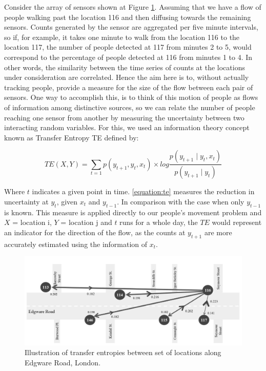 Consider the array of sensors shown at Figure \ref{figure:applications:transent}. Assuming that we have a flow of people walking past the location 116 and then diffusing towards the remaining sensors.
Counts generated by the sensor are aggregated per five minute intervals, so if, for example, it takes one minute to walk from the location 116 to the location 117, the number of people detected at 117 from minutes 2 to 5, would correspond to the percentage of people detected at 116 from minutes 1 to 4.
In other words, the similarity between the time series of counts at the locations under consideration are correlated.
Hence the aim here is to, without actually tracking people, provide a measure for the size of the flow between each pair of sensors.
One way to accomplish this, is to think of this motion of people as flows of information among distinctive sources, so we can relate the number of people reaching one sensor from another by measuring the uncertainty between two interacting random variables.
For this, we used an information theory concept known as Transfer Entropy TE defined by:

\begin{equation} \label{equation:te}
  TE(X,Y) = \sum_{t=1} p(y_{t+1}, y_{t}, x_{t}) \times { log{ \frac{p(y_{t+1} \mid y_{t}, x_{t})}{p(y_{t+1} \mid y_{t})}} }
\end{equation}

Where $t$ indicates a given point in time.
\ref{equation:te} measures the reduction in uncertainty at $y_{t}$, given $x_{t}$ and $y_{t-1}$.
In comparison with the case when only $y_{t-1}$ is known.
This measure is applied directly to our people's movement problem and $X$ = location i, $Y$ = location j and $t$ runs for a whole day, the $TE$ would represent an indicator for the direction of the flow, as the counts at $y_{t+1}$ are more accurately estimated using the information of $x_{t}$.

\begin{figure}
  \includegraphics[trim={0 0 0 0},clip]{images/applications-transfer-entropy.png}
  \caption{Illustration of transfer entropies between set of locations along Edgware Road, London.}
  \label{figure:applications:transent}
\end{figure}

